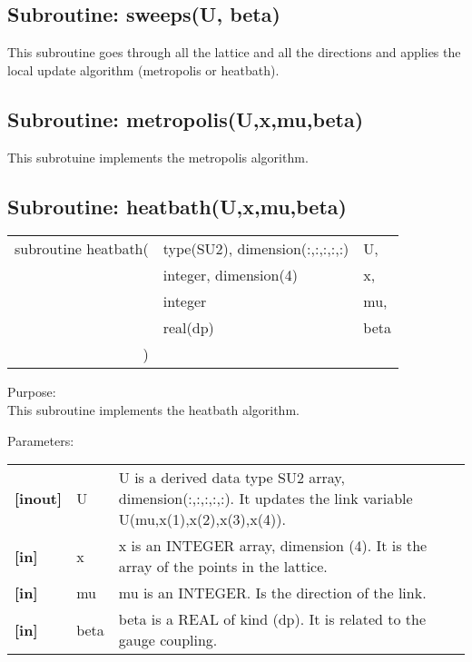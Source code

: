 \documentclass[12pt,a4paper]{article}
\begin{document}
	\subsection{Subroutine: sweeps(U, beta)}
	This subroutine goes through all the lattice and all the directions and applies the local update algorithm (metropolis or heatbath).	 
	
	\subsection{Subroutine: metropolis(U,x,mu,beta)}
	This subrotuine implements the metropolis algorithm.	 
 
 \subsection{Subroutine: heatbath(U,x,mu,beta)}
 \begin{tabular}{rll}
 subroutine heatbath(& type(SU2), dimension(:,:,:,:,:) & U, \\ 

  & integer, dimension(4) & x, \\ 

  & integer & mu, \\ 

  & real(dp) & beta \\ 
  ) & &
 \end{tabular} 
 
 Purpose:\\
 This subroutine implements the heatbath algorithm.
 
 Parameters:
 	
 \begin{tabularx}{\textwidth}{llX}
  \textbf{[inout]} & U & U is a derived data type SU2 array, dimension(:,:,:,:,:). It updates the link variable U(mu,x(1),x(2),x(3),x(4)). \\
  \textbf{[in]} & x & x is an INTEGER array, dimension (4). It is the array of the points in the lattice. \\ 
  \textbf{[in]} & mu & mu is an INTEGER. Is the direction of the link.  \\ 
  \textbf{[in]} & beta & beta is a REAL of kind (dp). It is related to the gauge coupling.
  \end{tabularx}  
  
  
\end{document}
